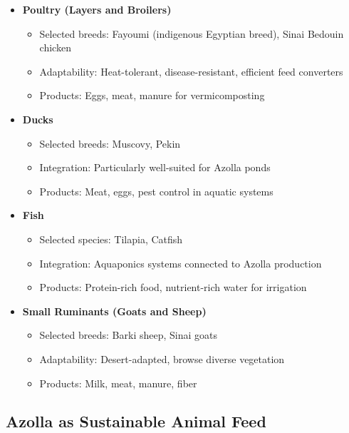 \begin{itemize}
    \item \textbf{Poultry (Layers and Broilers)}
    \begin{itemize}
        \item Selected breeds: Fayoumi (indigenous Egyptian breed), Sinai Bedouin chicken
        \item Adaptability: Heat-tolerant, disease-resistant, efficient feed converters
        \item Products: Eggs, meat, manure for vermicomposting
    \end{itemize}
    
    \item \textbf{Ducks}
    \begin{itemize}
        \item Selected breeds: Muscovy, Pekin
        \item Integration: Particularly well-suited for Azolla ponds
        \item Products: Meat, eggs, pest control in aquatic systems
    \end{itemize}
    
    \item \textbf{Fish}
    \begin{itemize}
        \item Selected species: Tilapia, Catfish
        \item Integration: Aquaponics systems connected to Azolla production
        \item Products: Protein-rich food, nutrient-rich water for irrigation
    \end{itemize}
    
    \item \textbf{Small Ruminants (Goats and Sheep)}
    \begin{itemize}
        \item Selected breeds: Barki sheep, Sinai goats
        \item Adaptability: Desert-adapted, browse diverse vegetation
        \item Products: Milk, meat, manure, fiber
    \end{itemize}
\end{itemize}

\subsection{Azolla as Sustainable Animal Feed}

